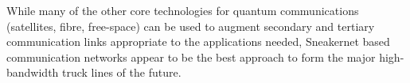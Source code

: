 \documentclass[twocolumn, aps, rmp, amsmath, amssymb, nofootinbib, superscriptaddress, longbibliography, floatfix, table-of-contents, eqsecnum]{revtex4-2}
\begin{document}
While many of the other core technologies for quantum communications (satellites, fibre, free-space) can be used to augment secondary and tertiary communication links appropriate to the applications needed, Sneakernet based communication networks appear to be the best approach to form the major high-bandwidth truck lines of the future. 


\end{document}
